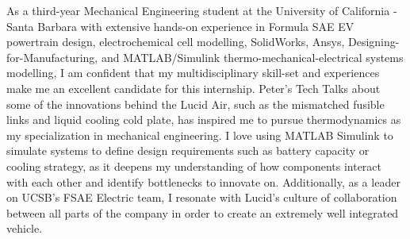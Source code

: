 \documentclass[11pt, letterpaper]{awesome-cv} %
\begin{document}
\makecvheader %

\makelettertitle %


\begin{cvletter}


As a third-year Mechanical Engineering student at the University of California - Santa Barbara with extensive hands-on experience in Formula SAE EV powertrain design, electrochemical cell modelling, SolidWorks, Ansys, Designing-for-Manufacturing, and MATLAB/Simulink thermo-mechanical-electrical systems modelling, I am confident that my multidisciplinary skill-set and experiences make me an excellent candidate for this internship. Peter's Tech Talks about some of the innovations behind the Lucid Air, such as the mismatched fusible links and liquid cooling cold plate, has inspired me to pursue thermodynamics as my specialization in mechanical engineering. I love using MATLAB Simulink to simulate systems to define design requirements such as battery capacity or cooling strategy, as it deepens my understanding of how components interact with each other and identify bottlenecks to innovate on. Additionally, as a leader on UCSB's FSAE Electric team, I resonate with Lucid's culture of collaboration between all parts of the company in order to create an extremely well integrated vehicle.


\end{cvletter}


\makeletterclosing %
\end{document}
